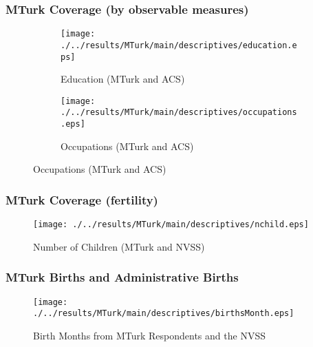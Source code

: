 \documentclass[10pt,letterpaper,subeqn]{beamer}
\begin{document}
\begin{frame}[label=MTurkCover2]
  \frametitle{MTurk Coverage (by observable measures)}
  \begin{figure}[htpb!]
    \begin{center}
      \label{fig:tempUSA}
      \begin{subfigure}{.5\textwidth}
        \centering
        \texttt{[image: ./../results/MTurk/main/descriptives/education.eps]}
        \caption{Education (MTurk and ACS)}
        \label{fig:tempUSAYoung}
      \end{subfigure}%
      \begin{subfigure}{.5\textwidth}
        \centering
        \texttt{[image: ./../results/MTurk/main/descriptives/occupations.eps]}
        \caption{Occupations (MTurk and ACS)}
        \label{fig:tempUSAOld}
      \end{subfigure}
    \end{center}
  \end{figure}
  \vspace{8mm}
\end{frame}


\begin{frame}[label=MTurkCover3]
  \frametitle{MTurk Coverage (fertility)}
  \begin{figure}[htpb!]
    \begin{center}
      \centering
      \caption{Number of Children (MTurk and NVSS)}
      \texttt{[image: ./../results/MTurk/main/descriptives/nchild.eps]}
    \end{center}
  \end{figure}
  \vspace{-5mm}
\end{frame}

\begin{frame}
  \frametitle{MTurk Births and Administrative Births}
  \begin{figure}[htpb!]
  \begin{center}
    \caption{Birth Months from MTurk Respondents and the NVSS}
    \label{fig:compBmonth}
    \texttt{[image: ./../results/MTurk/main/descriptives/birthsMonth.eps]}
  \end{center}
\end{figure}
\end{frame}
\end{document}
